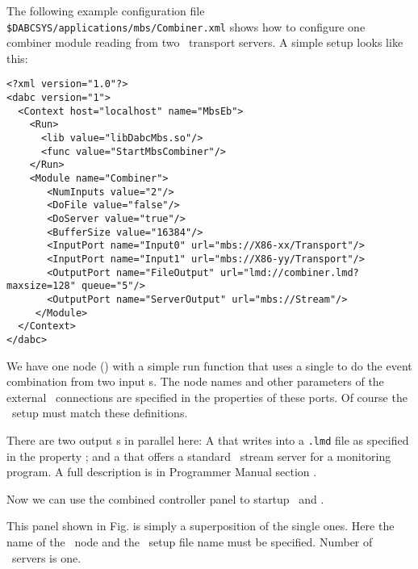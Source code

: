 The following example configuration file {\tt \$DABCSYS/applications/mbs/Combiner.xml} shows how to 
configure one combiner module reading from two \mbs\ transport servers.
A simple setup looks like this:

\begin{small}
\begin{verbatim}
<?xml version="1.0"?>
<dabc version="1">
  <Context host="localhost" name="MbsEb">
    <Run>
      <lib value="libDabcMbs.so"/>
      <func value="StartMbsCombiner"/>
    </Run>
    <Module name="Combiner">
       <NumInputs value="2"/>
       <DoFile value="false"/>
       <DoServer value="true"/>
       <BufferSize value="16384"/>
       <InputPort name="Input0" url="mbs://X86-xx/Transport"/>
       <InputPort name="Input1" url="mbs://X86-yy/Transport"/>
       <OutputPort name="FileOutput" url="lmd://combiner.lmd?maxsize=128" queue="5"/>
       <OutputPort name="ServerOutput" url="mbs://Stream"/>
     </Module>
  </Context>
</dabc>
\end{verbatim}
\end{small}

We have one node () with a simple run function 
 that uses a single  to do the
event combination from two input s.
The node names and other parameters of the external \mbs\ connections
are specified in the  properties of these ports.
Of course the \mbs\ setup must match these definitions. 

There are two output s in parallel here: A 
that writes into a {\tt *.lmd} file as specified in the property 
; and a  that offers a standard \mbs\ stream server
for a monitoring program.
A full description is in Programmer Manual section
.

Now we can use the combined  controller panel to startup \mbs\ and \dabc.

This panel shown in Fig.  is simply a superposition of the single ones.
Here the   name of the \dabc\ node and
the \dabc\ setup file name must be specified. Number of \dabc\ servers is one.

